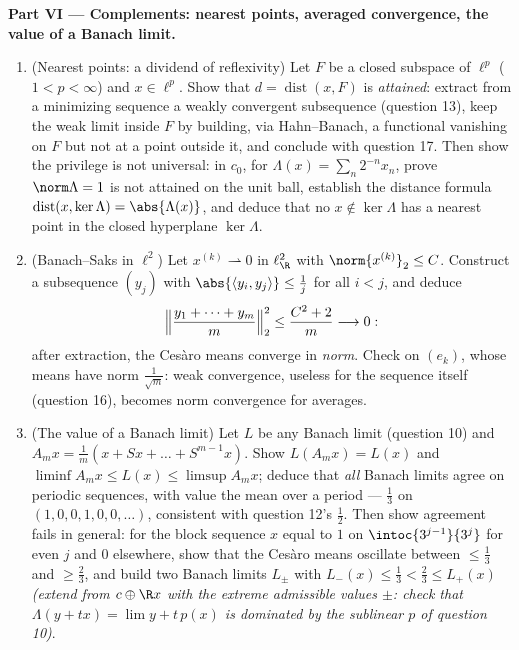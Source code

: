 \begin{problem}[{Weekend problem --- $(\ell^p)' = \ell^q$,
reflexivity, and the strangeness of $\ell^\infty$}]
\medskip
\noindent\textbf{Part VI --- Complements: nearest points,
averaged convergence, the value of a Banach limit.}
\begin{enumerate}[resume]
  \item (Nearest points: a dividend of reflexivity) Let $F$ be
        a closed subspace of $\ell^p$ ($1 < p < \infty$) and
        $x \in \ell^p$. Show that $d = \operatorname{dist}(x,
        F)$ is \emph{attained}: extract from a minimizing
        sequence a weakly convergent subsequence (question
        13), keep the weak limit inside $F$ by building, via
        Hahn--Banach, a functional vanishing on $F$ but not at
        a point outside it, and conclude with question 17.
        Then show the privilege is not universal: in $c_0$,
        for $\Lambda(x) = \sum_n2^{-n}x_n$, prove
        $\norm\Lambda = 1$ is not attained on the unit ball,
        establish the distance formula
        $\operatorname{dist}(x, \ker\Lambda) =
        \abs{\Lambda(x)}$, and deduce that no $x \notin
        \ker\Lambda$ has a nearest point in the closed
        hyperplane $\ker\Lambda$.
  \item (Banach--Saks in $\ell^2$) Let $x^{(k)}
        \rightharpoonup 0$ in $\ell^2_{\R}$ with
        $\norm{x^{(k)}}_2 \leq C$. Construct a subsequence
        $(y_j)$ with $\abs{\langle y_i, y_j\rangle} \leq
        \frac1j$ for all $i < j$, and deduce
        \[
        \Bigl\lVert\frac{y_1 + \dots + y_m}m\Bigr\rVert_2^2
        \leq \frac{C^2 + 2}m \longrightarrow 0 :
        \]
        after extraction, the Ces\`aro means converge in
        \emph{norm}. Check on $(e_k)$, whose means have norm
        $\frac1{\sqrt m}$: weak convergence, useless for the
        sequence itself (question 16), becomes norm
        convergence for averages.
  \item (The value of a Banach limit) Let $L$ be any Banach
        limit (question 10) and $A_mx = \frac1m(x + Sx + \dots
        + S^{m-1}x)$. Show $L(A_mx) = L(x)$ and $\liminf A_mx
        \leq L(x) \leq \limsup A_mx$; deduce that \emph{all}
        Banach limits agree on periodic sequences, with value
        the mean over a period --- $\frac13$ on $(1, 0, 0, 1,
        0, 0, \dots)$, consistent with question 12's
        $\frac12$. Then show agreement fails in general: for
        the block sequence $x$ equal to $1$ on
        $\intoc{3^{j-1}}{3^j}$ for even $j$ and $0$ elsewhere,
        show that the Ces\`aro means oscillate between $\leq
        \frac13$ and $\geq \frac23$, and build two Banach
        limits $L_\pm$ with $L_-(x) \leq \frac13 < \frac23
        \leq L_+(x)$ \emph{(extend from $c \oplus \R x$ with
        the extreme admissible values $\pm$: check that
        $\Lambda(y + tx) = \lim y + t\,p(x)$ is dominated by
        the sublinear $p$ of question 10)}.
\end{enumerate}
\end{problem}
